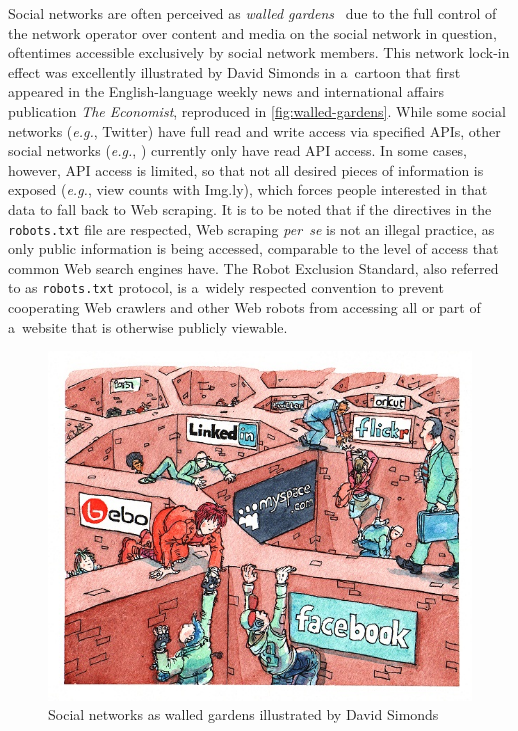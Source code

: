 Social networks are often perceived as
\emph{walled gardens}~\cite{simonds2008walledgarden}
due to the full control of the network operator
over content and media on the social network in question,
oftentimes accessible exclusively by social network members.
This network lock-in effect was excellently illustrated
by David Simonds in a~cartoon that first appeared
in the English-language weekly news and
international affairs publication \emph{The Economist},
reproduced in \autoref{fig:walled-gardens}.
While some social networks (\emph{e.g.}, Twitter)
have full read and write access via specified APIs,
other social networks (\emph{e.g.}, \googleplus)
currently only have read API access.
In some cases, however, API access is limited,
so that not all desired pieces of information is exposed
(\emph{e.g.}, view counts with Img.ly),
which forces people interested in that data
to fall back to Web scraping.
It is to be noted that if the directives in the 
\texttt{robots.txt} file are respected,
Web scraping \emph{per~se} is not an illegal practice,
as only public information is being accessed,
comparable to the level of access that common Web search engines have.
The Robot Exclusion Standard,
also referred to as \texttt{robots.txt} protocol,
is a~widely respected convention to prevent cooperating Web crawlers
and other Web robots
from accessing all or part of a~website
that is otherwise publicly viewable.

\begin{figure}[!ht]
  \centering
  \includegraphics[width=0.7\linewidth,
    trim=16px 17px 12px 15px,clip]{davidsimonds.jpg}
  \caption[Social networks as walled
    gardens illustrated by David Simonds]
    {Social networks as walled gardens illustrated by David Simonds}
  \label{fig:walled-gardens}
\end{figure}

